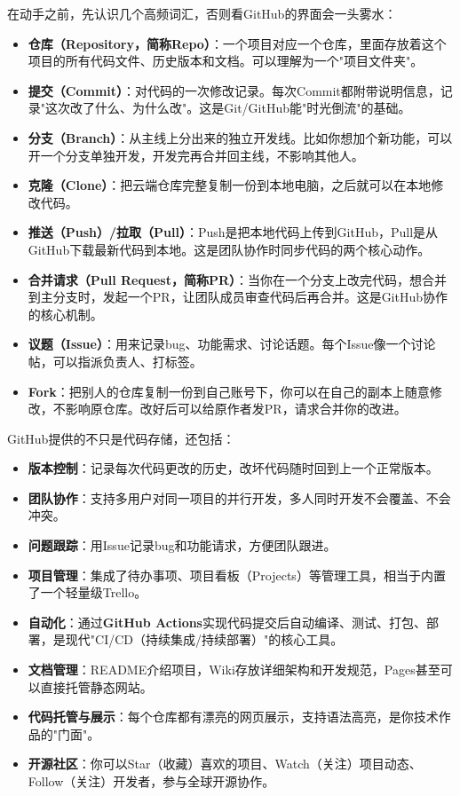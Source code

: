 
在动手之前，先认识几个高频词汇，否则看GitHub的界面会一头雾水：

\begin{itemize}
  \item \textbf{仓库（Repository，简称Repo）}：一个项目对应一个仓库，里面存放着这个项目的所有代码文件、历史版本和文档。可以理解为一个"项目文件夹"。
  \item \textbf{提交（Commit）}：对代码的一次修改记录。每次Commit都附带说明信息，记录"这次改了什么、为什么改"。这是Git/GitHub能"时光倒流"的基础。
  \item \textbf{分支（Branch）}：从主线上分出来的独立开发线。比如你想加个新功能，可以开一个分支单独开发，开发完再合并回主线，不影响其他人。
  \item \textbf{克隆（Clone）}：把云端仓库完整复制一份到本地电脑，之后就可以在本地修改代码。
  \item \textbf{推送（Push）/拉取（Pull）}：Push是把本地代码上传到GitHub，Pull是从GitHub下载最新代码到本地。这是团队协作时同步代码的两个核心动作。
  \item \textbf{合并请求（Pull Request，简称PR）}：当你在一个分支上改完代码，想合并到主分支时，发起一个PR，让团队成员审查代码后再合并。这是GitHub协作的核心机制。
  \item \textbf{议题（Issue）}：用来记录bug、功能需求、讨论话题。每个Issue像一个讨论帖，可以指派负责人、打标签。
  \item \textbf{Fork}：把别人的仓库复制一份到自己账号下，你可以在自己的副本上随意修改，不影响原仓库。改好后可以给原作者发PR，请求合并你的改进。
\end{itemize}


GitHub提供的不只是代码存储，还包括：

\begin{itemize}
  \item \textbf{版本控制}：记录每次代码更改的历史，改坏代码随时回到上一个正常版本。
  \item \textbf{团队协作}：支持多用户对同一项目的并行开发，多人同时开发不会覆盖、不会冲突。
  \item \textbf{问题跟踪}：用Issue记录bug和功能请求，方便团队跟进。
  \item \textbf{项目管理}：集成了待办事项、项目看板（Projects）等管理工具，相当于内置了一个轻量级Trello。
  \item \textbf{自动化}：通过\textbf{GitHub Actions}实现代码提交后自动编译、测试、打包、部署，是现代"CI/CD（持续集成/持续部署）"的核心工具。
  \item \textbf{文档管理}：README介绍项目，Wiki存放详细架构和开发规范，Pages甚至可以直接托管静态网站。
  \item \textbf{代码托管与展示}：每个仓库都有漂亮的网页展示，支持语法高亮，是你技术作品的"门面"。
  \item \textbf{开源社区}：你可以Star（收藏）喜欢的项目、Watch（关注）项目动态、Follow（关注）开发者，参与全球开源协作。
\end{itemize}

